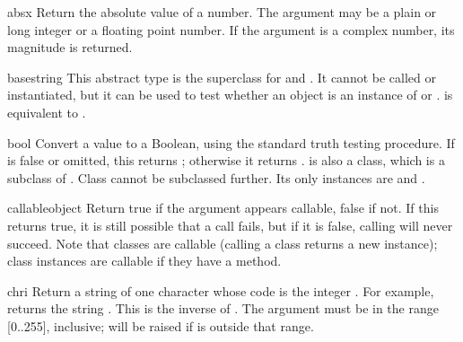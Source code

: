 \begin{funcdesc}{abs}{x}
  Return the absolute value of a number.  The argument may be a plain
  or long integer or a floating point number.  If the argument is a
  complex number, its magnitude is returned.
\end{funcdesc}

\begin{funcdesc}{basestring}{}
  This abstract type is the superclass for  and .
  It cannot be called or instantiated, but it can be used to test whether
  an object is an instance of  or .
   is equivalent to
  .
\end{funcdesc}

\begin{funcdesc}{bool}{}
  Convert a value to a Boolean, using the standard truth testing
  procedure.  If  is false or omitted, this returns
  ; otherwise it returns .
   is also a class, which is a subclass of .
  Class  cannot be subclassed further.  Its only instances
  are  and .

\end{funcdesc}

\begin{funcdesc}{callable}{object}
  Return true if the  argument appears callable, false if
  not.  If this returns true, it is still possible that a call fails,
  but if it is false, calling  will never succeed.  Note
  that classes are callable (calling a class returns a new instance);
  class instances are callable if they have a 
  method.
\end{funcdesc}

\begin{funcdesc}{chr}{i}
  Return a string of one character whose \ASCII{} code is the integer
  .  For example,  returns the string .
  This is the inverse of .  The argument must be in
  the range [0..255], inclusive;  will be raised
  if  is outside that range.
\end{funcdesc}


